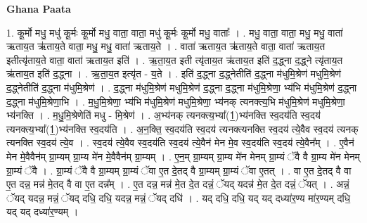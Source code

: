 \documentclass[17pt]{extarticle}
\begin{document}
\textbf{Ghana Paata } \newline

1. कू॒र्मो मधु॒ मधु॑ कू॒र्मः कू॒र्मो मधु॒ वाता॒ वाता॒ मधु॑ कू॒र्मः कू॒र्मो मधु॒ वाताः᳚ । . मधु॒ वाता॒ वाता॒ मधु॒ मधु॒ वाता॑ ऋताय॒त ऋ॑ताय॒ते वाता॒ मधु॒ मधु॒ वाता॑ ऋताय॒ते । . वाता॑ ऋताय॒त ऋ॑ताय॒ते वाता॒ वाता॑ ऋताय॒त इतीत्यृ॑ताय॒ते वाता॒ वाता॑ ऋताय॒त इति॑ । . ऋ॒ता॒य॒त इती त्यृ॑ताय॒त ऋ॑ताय॒त इति॑ द॒द्ध्ना द॒द्ध्ने त्यृ॑ताय॒त ऋ॑ताय॒त इति॑ द॒द्ध्ना । . ऋ॒ता॒य॒त इत्यृ॑त - य॒ते । . इति॑ द॒द्ध्ना द॒द्ध्नेतीति॑ द॒द्ध्ना म॑धुमि॒श्रेण॑ मधुमि॒श्रेण॑ द॒द्ध्नेतीति॑ द॒द्ध्ना म॑धुमि॒श्रेण॑ । . द॒द्ध्ना म॑धुमि॒श्रेण॑ मधुमि॒श्रेण॑ द॒द्ध्ना द॒द्ध्ना म॑धुमि॒श्रेणा॒ भ्य॑भि म॑धुमि॒श्रेण॑ द॒द्ध्ना द॒द्ध्ना म॑धुमि॒श्रेणा॒भि । . म॒धु॒मि॒श्रेणा॒ भ्य॑भि म॑धुमि॒श्रेण॑ मधुमि॒श्रेणा॒ भ्य॑नक् त्यनक्त्य॒भि म॑धुमि॒श्रेण॑ मधुमि॒श्रेणा॒ भ्य॑नक्ति । . म॒धु॒मि॒श्रेणेति॑ मधु - मि॒श्रेण॑ । . अ॒भ्य॑नक् त्यनक्त्य॒भ्या᳚(1॒)भ्य॑नक्ति स्व॒दय॑ति स्व॒दय॑ त्यनक्त्य॒भ्या᳚(1॒)भ्य॑नक्ति स्व॒दय॑ति । . अ॒न॒क्ति॒ स्व॒दय॑ति स्व॒दय॑ त्यनक्त्यनक्ति स्व॒दय॑ त्ये॒वैव स्व॒दय॑ त्यनक् त्यनक्ति स्व॒दय॑ त्ये॒व । . स्व॒दय॑ त्ये॒वैव स्व॒दय॑ति स्व॒दय॑ त्ये॒वैन॑ मेन मे॒व स्व॒दय॑ति स्व॒दय॑ त्ये॒वैन᳚म् । . ए॒वैन॑ मेन मे॒वैवैन॑म् ग्रा॒म्यम् ग्रा॒म्य मे॑न मे॒वैवैन॑म् ग्रा॒म्यम् । . ए॒न॒म् ग्रा॒म्यम् ग्रा॒म्य मे॑न मेनम् ग्रा॒म्यं ॅवै वै ग्रा॒म्य मे॑न मेनम् ग्रा॒म्यं ॅवै । . ग्रा॒म्यं ॅवै वै ग्रा॒म्यम् ग्रा॒म्यं ॅवा ए॒त दे॒तद् वै ग्रा॒म्यम् ग्रा॒म्यं ॅवा ए॒तत् । . वा ए॒त दे॒तद् वै वा ए॒त दन्न॒ मन्न॑ मे॒तद् वै वा ए॒त दन्न᳚म् । . ए॒त दन्न॒ मन्न॑ मे॒त दे॒त दन्नं॒ ॅयद् यदन्न॑ मे॒त दे॒त दन्नं॒ ॅयत् । . अन्नं॒ ॅयद् यदन्न॒ मन्नं॒ ॅयद् दधि॒ दधि॒ यदन्न॒ मन्नं॒ ॅयद् दधि॑ । . यद् दधि॒ दधि॒ यद् यद् दध्या॑र॒ण्य मा॑र॒ण्यम् दधि॒ यद् यद् दध्या॑र॒ण्यम् । \newline
\end{document}
